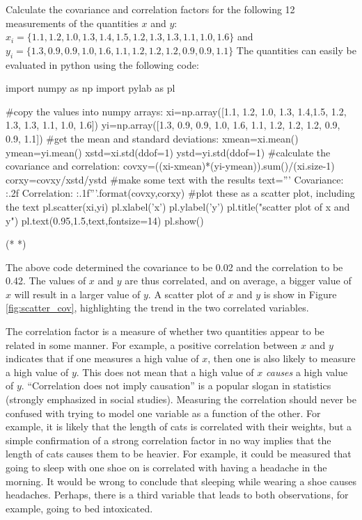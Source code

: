 \begin{example}{Calculate the covariance and correlation factors for the following 12 measurements of the quantities $x$ and $y$: $x_i=\{1.1, 1.2, 1.0, 1.3, 1.4,1.5, 1.2, 1.3, 1.3, 1.1, 1.0, 1.6\}$ and $y_i=\{1.3, 0.9, 0.9, 1.0, 1.6, 1.1, 1.2, 1.2, 1.2, 0.9, 0.9, 1.1\}$}
\label{ex:covariance}
The quantities can easily be evaluated in python using the following code:
\begin{python}[caption = Calculating covariance and correlation]
import numpy as np
import pylab as pl

#copy the values into numpy arrays:
xi=np.array([1.1, 1.2, 1.0, 1.3, 1.4,1.5, 1.2, 1.3, 1.3, 1.1, 1.0, 1.6])
yi=np.array([1.3, 0.9, 0.9, 1.0, 1.6, 1.1, 1.2, 1.2, 1.2, 0.9, 0.9, 1.1])
#get the mean and standard deviations:
xmean=xi.mean()
ymean=yi.mean()
xstd=xi.std(ddof=1)
ystd=yi.std(ddof=1)
#calculate the covariance and correlation:
covxy=((xi-xmean)*(yi-ymean)).sum()/(xi.size-1)
corxy=covxy/xstd/ystd
#make some text with the results
text='''
Covariance: {:.2f}
Correlation: {:.1f}'''.format(covxy,corxy)
#plot these as a scatter plot, including the text
pl.scatter(xi,yi)
pl.xlabel('x')
pl.ylabel('y')
pl.title("scatter plot of x and y")
pl.text(0.95,1.5,text,fontsize=14)
pl.show()
\end{python}
\begin{poutput}
(*  *)
\end{poutput}
The above code determined the covariance to be 0.02 and the correlation to be 0.42. The values of $x$ and $y$ are thus correlated, and on average, a bigger value of $x$ will result in a larger value of $y$. A scatter plot of $x$ and $y$ is show in Figure \ref{fig:scatter_cov}, highlighting the trend in the two correlated variables.
\end{example}

The correlation factor is a measure of whether two quantities appear to be related in some manner. For example, a positive correlation between $x$ and $y$ indicates that if one measures a high value of $x$, then one is also likely to measure a high value of $y$. This does not mean that a high value of $x$ \textit{causes} a high value of $y$. ``Correlation does not imply causation'' is a popular slogan in statistics (strongly emphasized in social studies). Measuring the correlation should never be confused with trying to model one variable as a function of the other. For example, it is likely that the length of cats is correlated with their weights, but a simple confirmation of a strong correlation factor in no way implies that the length of cats causes them to be heavier. For example, it could be measured that going to sleep with one shoe on is correlated with having a headache in the morning. It would be wrong to conclude that sleeping while wearing a shoe causes headaches. Perhaps, there is a third variable that leads to both observations, for example, going to bed intoxicated. 

